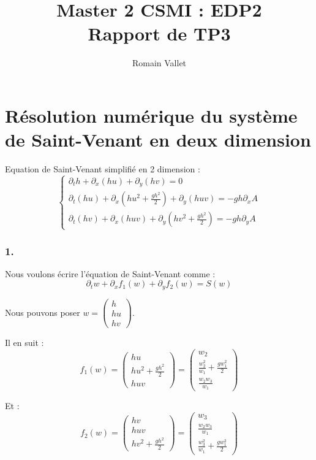 \documentclass{article}
\title{Master 2 CSMI : EDP2\\Rapport de TP3}
\author{Romain Vallet}
\begin{document}
\maketitle

\section{Résolution numérique du système de Saint-Venant en deux dimension}

Equation de Saint-Venant simplifié en 2 dimension :
\[ \left\{ \begin{matrix}
	\partial_t h + \partial_x (hu) + \partial_y (hv) = 0 \\
	\partial_t (hu) + \partial_x (hu^2 + \frac{gh^2}{2}) + \partial_y (huv) = - gh \partial_x A \\
	\partial_t (hv) + \partial_x (huv) + \partial_y (hv^2 + \frac{gh^2}{2})  = - gh \partial_y A 
\end{matrix} \right. \]

\subsubsection*{1.}

Nous voulons écrire l'équation de Saint-Venant comme :
\[ \partial_t w + \partial_x f_1(w) + \partial_y f_2(w) = S(w) \]

Nous pouvons poser $w = \begin{pmatrix} h \\ hu \\ hv \end{pmatrix}$.
\newline

Il en suit :
\[ f_1(w) = \begin{pmatrix} hu \\ hu^2 + \frac{gh^2}{2} \\ huv \end{pmatrix} = \begin{pmatrix} w_2 \\ \frac{w_2^2}{w_1} + \frac{g w_1^2}{2} \\ \frac{w_2 w_3}{w_1} \end{pmatrix} \]

Et :
\[ f_2(w) = \begin{pmatrix} hv \\ huv \\ hv^2 + \frac{gh^2}{2} \end{pmatrix} = \begin{pmatrix} w_3 \\ \frac{w_2 w_3}{w_1} \\ \frac{w_3^2}{w_1} + \frac{g w_1^2}{2} \end{pmatrix} \]
\end{document}
